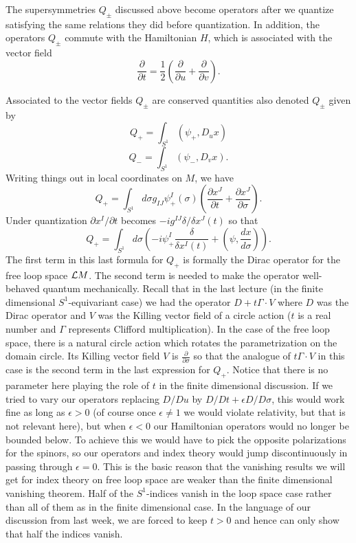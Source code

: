 The supersymmetries $Q_\pm$ discussed above become operators after we
quantize satisfying the same relations they did before quantization.
In addition, 
the operators $Q_\pm$ commute with the Hamiltonian $H$, which is
associated with the vector field
$$\frac{\partial }{\partial t}=\frac{1}{2}\left(\frac{\partial}{\partial
u}+\frac{\partial}{\partial v}\right).$$

Associated to the vector fields  $Q_\pm$ are conserved quantities also
denoted $Q_\pm$ given by
$$Q_+=\int_{S^1}(\psi_+,D_ux)$$
$$Q_-=\int_{S^1}(\psi_-,D_vx).$$
Writing things out in local coordinates on $M$, we have
$$Q_+=\int_{S^1}d\sigma g_{IJ}\psi_+^I(\sigma)\left(\frac{\partial
x^J}{\partial t}+\frac{\partial x^J}{\partial \sigma}\right).$$
Under quantization $\partial x^I/\partial t$ becomes $-ig^{IJ}\delta/\delta
x^J(t)$ so that
$$Q_+=\int_{S^1}d\sigma\left(-i\psi_+^I\frac{\delta}{\delta
x^I(t)}+(\psi,\frac{dx}{d\sigma})\right).$$ 
The first term in this last formula for $Q_+$
is formally the Dirac operator for the free loop space
${\cal L}M$. The second term is needed to make the operator
well-behaved quantum mechanically. 
Recall that in the last lecture (in the finite dimensional
$S^1$-equivariant case) we
had the operator $D+t\Gamma\cdot V$ where $D$ was the Dirac operator
and $V$ was the Killing vector field of a circle action ($t$ is a real
number and $\Gamma$
represents Clifford multiplication). In the case of the free loop
space, there is a natural circle action which rotates the
parametrization on the domain circle. Its Killing vector field $V$ is
$\frac{\partial }{\partial \sigma}$ so that the analogue of
$t\Gamma\cdot V$ in this case is the second term in the last
expression for $Q_+$. Notice that there is no parameter here
playing the role of $t$ in the finite dimensional discussion. 
If we tried to vary our operators replacing $D/Du$ by $D/Dt+\epsilon
D/D\sigma$, this would work fine as long as $\epsilon>0$ (of course
once $\epsilon\not=1$ we would violate relativity, but that is not
relevant here), but when $\epsilon<0$ our Hamiltonian operators would
no longer be bounded below. To achieve this we would have to pick the
opposite polarizations for the spinors, so our operators
and index theory would jump discontinuously in passing through $\epsilon=0$.
 This is the basic reason that
the vanishing results we will get  for index theory
on free loop space are weaker than the finite dimensional
vanishing theorem.
Half of the $S^1$-indices vanish in the loop space case rather than all of them
as in the finite dimensional case. In the language of our discussion
from last week, we are forced to keep $t>0$ and hence can only show that
half the indices vanish.


